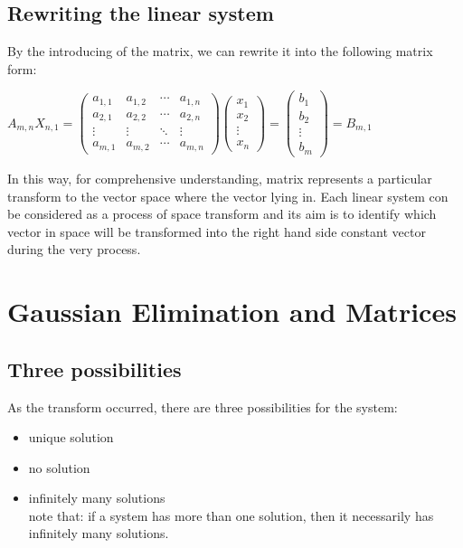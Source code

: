 \documentclass[UTF8,a4paper, 10pt, openany]{svmono}
\begin{document}
\subsection{Rewriting the linear system}
By the introducing of the matrix, we can rewrite it into the following matrix form:
\begin{center}
$A_{m,n}X_{n,1}= 
 \begin{pmatrix}
  a_{1,1} & a_{1,2} & \cdots & a_{1,n} \\
  a_{2,1} & a_{2,2} & \cdots & a_{2,n} \\
  \vdots  & \vdots  & \ddots & \vdots  \\
  a_{m,1} & a_{m,2} & \cdots & a_{m,n} 
 \end{pmatrix} 
 \begin{pmatrix}
  x_{1}\\
  x_{2}\\
  \vdots \\
  x_{n} 
 \end{pmatrix}=
 \begin{pmatrix}
  b_{1}\\
  b_{2}\\
  \vdots \\
  b_{m} 
 \end{pmatrix}
 =B_{m,1}$
\end{center}
In this way, for comprehensive understanding, matrix represents a particular transform to the vector space where the vector lying in. Each linear system con be considered as a process of space transform and its aim is to identify which vector in space will be transformed into the right hand side constant vector during the very process.

\section{Gaussian Elimination and Matrices}
\subsection{Three possibilities}
As the transform occurred, there are three possibilities for the system:
\begin{itemize}
\item{unique solution}
\item{no solution}
\item{infinitely many solutions}
\\note that: if a system has more than one solution, then it necessarily has infinitely many solutions.
\end{itemize}
\end{document}
